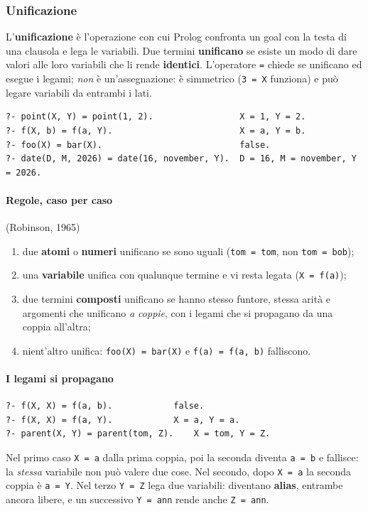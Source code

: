 \documentclass[a4paper,12pt]{article}
\begin{document}
\subsubsection{Unificazione}
L'\textbf{unificazione} è l'operazione con cui Prolog confronta un goal con la testa di una
clausola e lega le variabili. Due termini \textbf{unificano} se esiste un modo di dare valori
alle loro variabili che li rende \textbf{identici}. L'operatore \texttt{=} chiede se unificano ed
esegue i legami; \emph{non} è un'assegnazione: è simmetrico (\texttt{3 = X} funziona) e può legare
variabili da entrambi i lati.
\begin{verbatim}
?- point(X, Y) = point(1, 2).                 X = 1, Y = 2.
?- f(X, b) = f(a, Y).                         X = a, Y = b.
?- foo(X) = bar(X).                           false.
?- date(D, M, 2026) = date(16, november, Y).  D = 16, M = november, Y = 2026.
\end{verbatim}
\paragraph{Regole, caso per caso} (Robinson, 1965)
\begin{enumerate}[nosep]
  \item due \textbf{atomi} o \textbf{numeri} unificano se sono uguali (\texttt{tom = tom}, non
        \texttt{tom = bob});
  \item una \textbf{variabile} unifica con qualunque termine e vi resta legata
        (\texttt{X = f(a)});
  \item due termini \textbf{composti} unificano se hanno stesso funtore, stessa arità e argomenti
        che unificano \emph{a coppie}, con i legami che si propagano da una coppia all'altra;
  \item nient'altro unifica: \texttt{foo(X) = bar(X)} e \texttt{f(a) = f(a, b)} falliscono.
\end{enumerate}

\paragraph{I legami si propagano}
\begin{verbatim}
?- f(X, X) = f(a, b).            false.
?- f(X, X) = f(a, Y).            X = a, Y = a.
?- parent(X, Y) = parent(tom, Z).    X = tom, Y = Z.
\end{verbatim}
Nel primo caso \texttt{X = a} dalla prima coppia, poi la seconda diventa \texttt{a = b} e
fallisce: la \emph{stessa} variabile non può valere due cose. Nel secondo, dopo \texttt{X = a} la
seconda coppia è \texttt{a = Y}. Nel terzo \texttt{Y = Z} lega due variabili: diventano
\textbf{alias}, entrambe ancora libere, e un successivo \texttt{Y = ann} rende anche
\texttt{Z = ann}.
\end{document}

